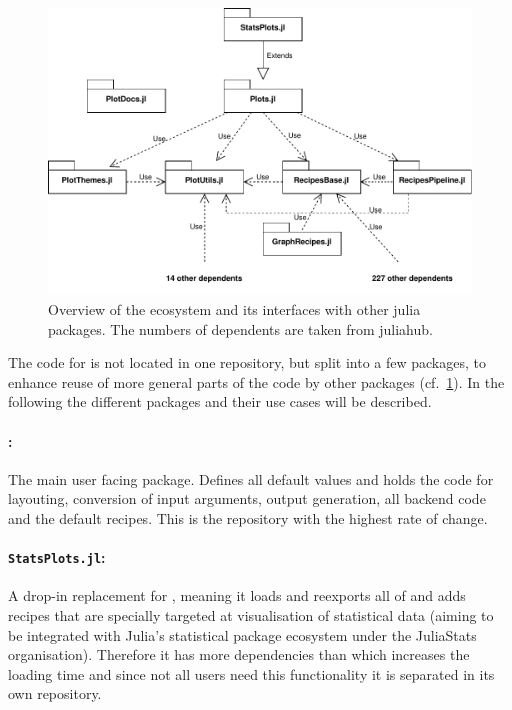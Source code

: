 \begin{figure}[H]
    \centering
    \includegraphics[width=\textwidth]{./fig/Ecosystem.pdf}
    \caption{
        Overview of the \Plots ecosystem and its interfaces with other julia packages.
        The numbers of dependents are taken from juliahub\cite{PlotsJuliaHub}.
    }
    \label{fig:ecosystem}
\end{figure}

The code for \Plots is not located in one repository, but split into a few packages, to enhance reuse of more general parts of the code by other packages (cf.~\cref{fig:ecosystem}).
In the following the different packages and their use cases will be described.

\paragraph{\Plots:} The main user facing package.
Defines all default values and holds the code for layouting, conversion of input arguments, output generation, all backend code and the default recipes.
This is the repository with the highest rate of change.

\paragraph{\texttt{StatsPlots.jl}:} A drop-in replacement for \Plots, meaning it loads and reexports all of \Plots and adds recipes that are specially targeted at visualisation of statistical data (aiming to be integrated with Julia's statistical package ecosystem under the JuliaStats organisation).
Therefore it has more dependencies than \Plots which increases the loading time and since not all users need this functionality it is separated in its own repository.

